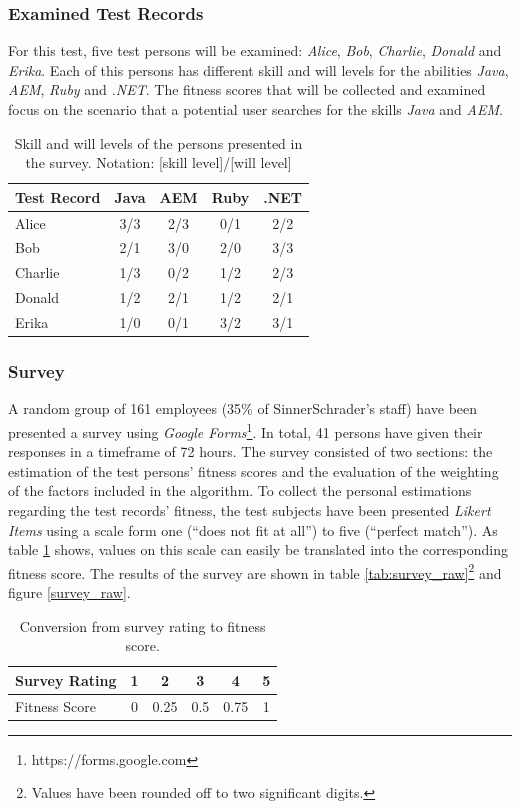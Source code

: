 \subsubsection{Examined Test Records}
For this test, five test persons will be examined: \textit{Alice}, \textit{Bob}, \textit{Charlie}, \textit{Donald} and \textit{Erika}. Each of this persons has different skill and will levels for the abilities \textit{Java}, \textit{AEM}, \textit{Ruby} and \textit{.NET}. The fitness scores that will be collected and examined focus on the scenario that a potential user searches for the skills \textit{Java} and \textit{AEM}.
\begin{table}[H]
\centering
  \begin{tabular}{l||c|c|c|c}
		Test Record  & Java & AEM & Ruby & .NET\\
		\hline
		Alice   & 3/3   & 2/3  & 0/1   & 2/2 \\
		Bob     & 2/1   & 3/0  & 2/0   & 3/3 \\
		Charlie & 1/3   & 0/2  & 1/2   & 2/3 \\
		Donald  & 1/2   & 2/1  & 1/2   & 2/1 \\
		Erika   & 1/0   & 0/1  & 3/2   & 3/1 \\
  \end{tabular}
\caption[Survey: Test Record Overview]{Skill and will levels of the persons presented in the survey. Notation: [skill level]/[will level]}
\end{table}

\newpage
\subsubsection{Survey}
A random group of 161 employees (35\% of SinnerSchrader's staff) have been presented a survey using \textit{Google Forms}\footnote{https://forms.google.com}.
In total, 41 persons have given their responses in a timeframe of 72 hours.
The survey consisted of two sections: the estimation of the test persons' fitness scores and the evaluation of the weighting of the factors included in the algorithm. To collect the personal estimations regarding the test records' fitness, the test subjects have been presented \textit{Likert Items} using a scale form one (``does not fit at all'') to five (``perfect match''). As table \ref{tab:scoretrans} shows, values on this scale can easily be translated into the corresponding fitness score. The results of the survey are shown in table \ref{tab:survey_raw}\footnote{Values have been rounded off to two significant digits.} and figure \ref{survey_raw}.
\begin{table}[H]
\centering
\begin{tabular}{l||c|c|c|c|c}
	Survey Rating & 1 & 2    & 3   & 4    & 5\\
	\hline
	Fitness Score & 0 & 0.25 & 0.5 & 0.75 & 1\\
\end{tabular}
\caption[Survey: Rating to Fitness Score]{Conversion from survey rating to fitness score.}
\label{tab:scoretrans}
\end{table}


